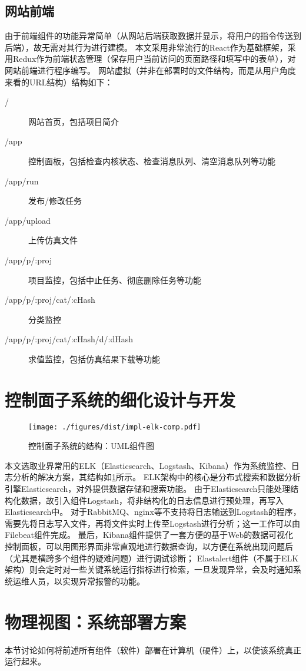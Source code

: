 \documentclass[index]{subfiles}
\begin{document}
\subsection{网站前端}
由于前端组件的功能异常简单（从网站后端获取数据并显示，将用户的指令传送到后端），故无需对其行为进行建模。
本文采用非常流行的React作为基础框架，采用Redux作为前端状态管理（保存用户当前访问的页面路径和填写中的表单），对网站前端进行程序编写。
网站虚拟（并非在部署时的文件结构，而是从用户角度来看的URL结构）结构如下：
\begin{description}
  \item[/] 网站首页，包括项目简介
  \item[/app] 控制面板，包括检查内核状态、检查消息队列、清空消息队列等功能
  \item[/app/run] 发布/修改任务
  \item[/app/upload] 上传仿真文件
  \item[/app/p/:proj] 项目监控，包括中止任务、彻底删除任务等功能
  \item[/app/p/:proj/cat/:cHash] 分类监控
  \item[/app/p/:proj/cat/:cHash/d/:dHash] 求值监控，包括仿真结果下载等功能
\end{description}

\section{控制面子系统的细化设计与开发}\label{sec:impl-elk}
\begin{figure}[h]
  \centering
  \texttt{[image: ./figures/dist/impl-elk-comp.pdf]}
  \caption{控制面子系统的结构：UML组件图\label{fig:impl-elk-comp}}
\end{figure}
本文选取业界常用的ELK（Elasticsearch、Logstash、Kibana）作为系统监控、日志分析的解决方案，其结构如\cref{fig:impl-elk-comp}所示。
ELK架构中的核心是分布式搜索和数据分析引擎Elasticsearch，对外提供数据存储和搜索功能。
由于Elasticsearch只能处理结构化数据，故引入组件Logstash，将非结构化的日志信息进行预处理，再写入Elasticsearch中。
对于RabbitMQ、nginx等不支持将日志输送到Logstash的程序，需要先将日志写入文件，再将文件实时上传至Logstash进行分析；这一工作可以由Filebeat组件完成。
最后，Kibana组件提供了一套方便的基于Web的数据可视化控制面板，可以用图形界面非常直观地进行数据查询，以方便在系统出现问题后（尤其是横跨多个组件的疑难问题）进行调试诊断；
Elastalert组件（不属于ELK架构）则会定时对一些关键系统运行指标进行检索，一旦发现异常，会及时通知系统运维人员，以实现异常报警的功能。

\section{物理视图：系统部署方案}
本节讨论如何将前述所有组件（软件）部署在计算机（硬件）上，以使该系统真正运行起来。
\end{document}
